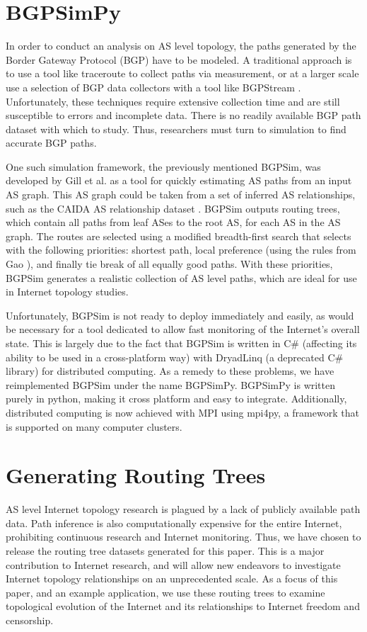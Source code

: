 \documentclass{article}
\begin{document}
\begin{multicols}{2}
\section{BGPSimPy}
In order to conduct an analysis on AS level topology, the paths
generated by the Border Gateway Protocol (BGP) have to be modeled. A
traditional approach is to use a tool like traceroute to collect paths via
measurement, or at a larger scale use a selection of BGP data collectors with
a tool like BGPStream \cite{bgpstream} \cite{traceroute}. Unfortunately, these
techniques require extensive collection time and are still susceptible to
errors and incomplete data. There is no readily available BGP path dataset
with which to study. Thus, researchers must turn to simulation to find
accurate BGP paths.     
\par One such simulation framework, the previously
mentioned BGPSim, was developed by Gill et al. \cite{quicksand} as a tool for
quickly estimating AS paths from an input AS graph. This AS graph could be
taken from a set of inferred AS relationships, such as the CAIDA AS
relationship dataset \cite{CAIDA}. BGPSim outputs routing trees, which contain
all paths from leaf ASes to the root AS, for each AS in the AS graph. The
routes are selected using a modified breadth-first search that selects with
the following priorities: shortest path, local preference (using the rules
from Gao \cite{gao}), and finally tie break of all equally good paths. With
these priorities, BGPSim generates a realistic collection of AS level paths,
which are ideal for use in Internet topology studies.
\par 
Unfortunately, BGPSim is not ready to deploy immediately and easily, as would be necessary
for a tool dedicated to allow fast monitoring of the Internet's overall state.
This is largely due to the fact that BGPSim is written in C\# (affecting its
ability to be used in a cross-platform way) with DryadLinq (a deprecated C\#
library) for distributed computing. As a remedy to these problems, we have
reimplemented BGPSim under the name BGPSimPy. BGPSimPy is written purely in
python, making it cross platform and easy to integrate. Additionally,
distributed computing is now achieved with MPI using mpi4py, a framework that
is supported on many computer clusters.

\section{Generating Routing Trees}
AS level Internet topology research is plagued
by a lack of publicly available path data. Path inference is also
computationally expensive for the entire Internet, prohibiting continuous
research and Internet monitoring. Thus, we have chosen to release the routing
tree datasets generated for this paper. This is a major contribution to
Internet research, and will allow new endeavors to investigate Internet
topology relationships on an unprecedented scale. As a focus of this paper,
and an example application, we use these routing trees to examine topological
evolution of the Internet and its relationships to Internet freedom and
censorship.


\end{multicols}
\end{document}
